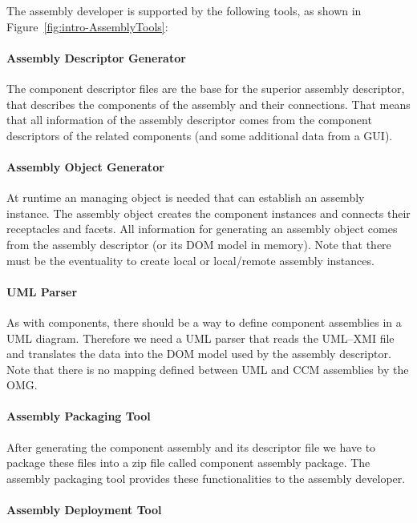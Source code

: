 The assembly developer is supported by the following tools, as shown in
Figure~\ref{fig:intro-AssemblyTools}:

\paragraph{Assembly Descriptor Generator}

The component descriptor files are the base for the superior assembly
descriptor, that describes the components of the assembly and their connections.
That means that all information of the assembly descriptor comes from the
component descriptors of the related components (and some additional data from a
GUI).

\paragraph{Assembly Object Generator}

At runtime an managing object is needed that can establish an assembly instance.
The assembly object creates the component instances and connects their
receptacles and facets. All information for generating an assembly object comes
from the assembly descriptor (or its DOM model in memory). Note that there must
be the eventuality to create local or local/remote assembly instances.

\paragraph{UML Parser}

As with components, there should be a way to define component assemblies in a
UML diagram. Therefore we need a UML parser that reads the UML--XMI file and
translates the data into the DOM model used by the assembly descriptor. Note
that there is no mapping defined between UML and CCM assemblies by the OMG.

\paragraph{Assembly Packaging Tool}

After generating the component assembly and its descriptor file we have to
package these files into a zip file called component assembly package. The
assembly packaging tool provides these functionalities to the assembly
developer.

\paragraph{Assembly Deployment Tool}

